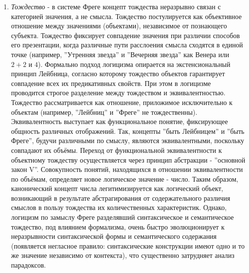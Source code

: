 \documentclass[12pt]{article}
\begin{document}
\begin{enumerate}
    \item {\it Тождество} - в системе Фреге концепт тождества неразрывно связан с категорией значения, а не смысла. Тождество постулируется как объективное отношение между значениями (объектами), независимое от познающего субъекта. Тождество фиксирует совпадение значения при различии способов его презентации, когда различные пути расслоения смысла сходятся в единой точке (например, ''Утренняя звезда'' и ''Вечерняя звезда'' как Венера или $2 + 2$ и $4$). Формально подход логицизма опирается на экстенсиональный принцип Лейбница, согласно которому тождество объектов гарантирует совпадение всех их предикативных свойств. При этом в логицизме проводится строгое разделение между тождеством и эквивалентностью. Тождество рассматривается как отношение, приложимое исключительно к объектам (например, ''Лейбниц'' и ''Фреге'' не тождественны). Эквивалентность выступает как функциональное понятие, фиксирующее общность различных отображений. Так, концепты ''быть Лейбницем'' и ''быть Фреге'', будучи различными по смыслу, являются эквивалентными, поскольку совпадают их объёмы. Переход от функциональной эквивалентности к объектному тождеству осуществляется через принцип абстракции - ''основной закон V''. Совокупность понятий, находящихся в отношении эквивалентности по объёмам, определяет новое логическое значение - число. Таким образом, канонический концепт числа легитимизируется как логический объект, возникающий в результате абстрагирования от содержательного различия смыслов в пользу тождества их количественных характеристик. Однако, логицизм по замыслу Фреге разделявший синтаксическое и семантическое тождество, под влиянием формализма, очень быстро эволюционирует к неразрывности синтаксической формы и семантического содержания (появляется негласное правило: синтаксические конструкции имеют одно и то же значение независимо от контекста), что существенно затрудняет анализ парадоксов. 

\end{enumerate}
\end{document}
